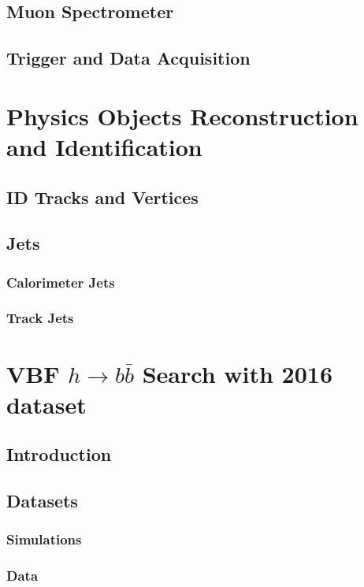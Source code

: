 \documentclass{report}
\begin{document}
\section{Muon Spectrometer}


\section{Trigger and Data Acquisition}


\chapter{Physics Objects Reconstruction and Identification}
\label{chap:reconstruction}
\section{ID Tracks and Vertices}
\section{Jets}
\subsection{Calorimeter Jets}
\subsection{Track Jets}
\clearpage

\chapter{VBF $h\rightarrow b\bar{b}$ Search with 2016 dataset}
\label{chap:vbf}
\section{Introduction}

\clearpage

\section{Datasets}
\subsection{Simulations}

\subsection{Data}

\clearpage
\end{document}
